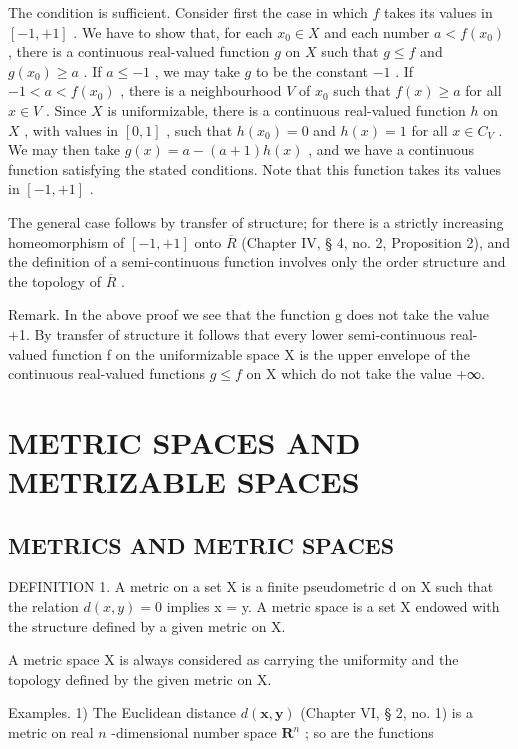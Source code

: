 The condition is sufficient. Consider first the case in which \(f\) takes its values in \([-1, +1]\) . We have to show that, for each \(x_0 \in X\) and each number \(a < f(x_0)\) , there is a continuous real-valued function \(g\) on \(X\) such that \(g \leqslant f\) and \(g(x_0) \geqslant a\) . If \(a \leqslant -1\) , we may take \(g\) to be the constant \(-1\) . If \(-1 < a < f(x_0)\) , there is a neighbourhood \(V\) of \(x_0\) such that \(f(x) \geqslant a\) for all \(x \in V\) . Since \(X\) is uniformizable, there is a continuous real-valued function \(h\) on \(X\) , with values in \([0, 1]\) , such that \(h(x_0) = 0\) and \(h(x) = 1\) for all \(x \in C_V\) . We may then take \(g(x) = a - (a + 1)h(x)\) , and we have a continuous function satisfying the stated conditions. Note that this function takes its values in \([-1, +1]\) .

The general case follows by transfer of structure; for there is a strictly increasing homeomorphism of \([-1, +1]\) onto \(\overline{R}\) (Chapter IV, § 4, no. 2, Proposition 2), and the definition of a semi-continuous function involves only the order structure and the topology of \(\overline{R}\) .

Remark. In the above proof we see that the function g does not take the value +1. By transfer of structure it follows that every lower semi-continuous real-valued function f on the uniformizable space X is the upper envelope of the continuous real-valued functions \(g \leqslant f\) on X which do not take the value +∞.

\section{METRIC SPACES AND METRIZABLE SPACES}

\subsection{METRICS AND METRIC SPACES}

DEFINITION 1. A metric on a set X is a finite pseudometric d on X such that the relation \(d(x, y) = 0\) implies x = y. A metric space is a set X endowed with the structure defined by a given metric on X.

A metric space X is always considered as carrying the uniformity and the topology defined by the given metric on X.

Examples. 1) The Euclidean distance \(d(\pmb{x}, \pmb{y})\) (Chapter VI, § 2, no. 1) is a metric on real \(n\) -dimensional number space \(\mathbf{R}^n\) ; so are the functions


